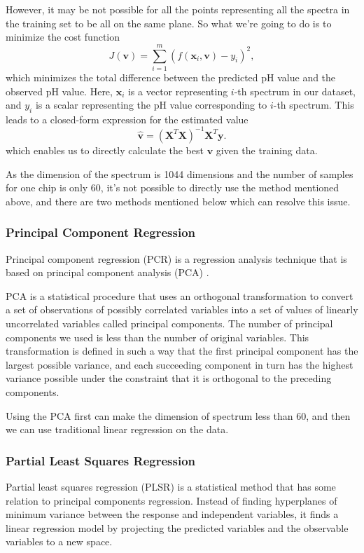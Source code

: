\documentclass[a4paper]{article}
\newcommand{\bfv}{\mathbf{v}}
\newcommand{\bfx}{\mathbf{x}}
\begin{document}
However, it may be not possible for all the points representing all the spectra in the training set to be all on the same plane. So what we're going to do is to minimize the cost function
\begin{equation}
J(\bfv)=\sum_{i=1}^m (f(\bfx_i,\bfv)-y_i)^2,
\end{equation}
which minimizes the total difference between the predicted pH value and the observed pH value. Here, $\bfx_i$ is a vector representing $i$-th spectrum in our dataset, and $y_i$ is a scalar representing the pH value corresponding to $i$-th spectrum. This leads to a closed-form expression for the estimated value
\begin{equation}
\hat{\bfv}=(\mathbf{X}^T\mathbf{X})^{-1}\mathbf{X}^T\mathbf{y}.
\end{equation}
which enables us to directly calculate the best $\bfv$ given the training data.

As the dimension of the spectrum is 1044 dimensions and the number of samples for one chip is only 60, it's not possible to directly use the method mentioned above, and there are two methods mentioned below which can resolve this issue.
\subsubsection{Principal Component Regression}
Principal component regression (PCR) is a regression analysis technique that is based on principal component analysis (PCA) \cite{jolliffe2005principal}. 

PCA is a statistical procedure that uses an orthogonal transformation to convert a set of observations of possibly correlated variables into a set of values of linearly uncorrelated variables called principal components. The number of principal components we used is less than the number of original variables. This transformation is defined in such a way that the first principal component has the largest possible variance, and each succeeding component in turn has the highest variance possible under the constraint that it is orthogonal to the preceding components.

Using the PCA first can make the dimension of spectrum less than 60, and then we can use traditional linear regression on the data.
\subsubsection{Partial Least Squares Regression}
Partial least squares regression (PLSR) \cite{geladi1986partial} is a statistical method that has some relation to principal components regression. Instead of finding hyperplanes of minimum variance between the response and independent variables, it finds a linear regression model by projecting the predicted variables and the observable variables to a new space.
\end{document}
